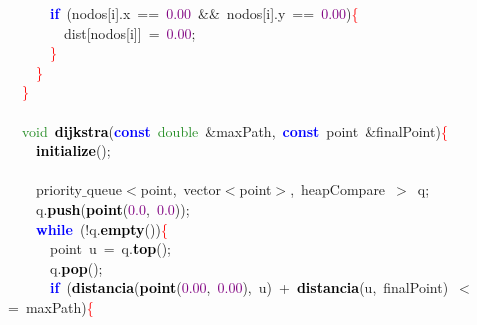 \mbox{}\ \ \ \ \ \ \textbf{\textcolor{Blue}{if}}\ \textcolor{BrickRed}{(}nodos\textcolor{BrickRed}{[}i\textcolor{BrickRed}{].}x\ \textcolor{BrickRed}{==}\ \textcolor{Purple}{0.00}\ \textcolor{BrickRed}{\&\&}\ nodos\textcolor{BrickRed}{[}i\textcolor{BrickRed}{].}y\ \textcolor{BrickRed}{==}\ \textcolor{Purple}{0.00}\textcolor{BrickRed}{)}\textcolor{Red}{\{} \\
\mbox{}\ \ \ \ \ \ \ \ dist\textcolor{BrickRed}{[}nodos\textcolor{BrickRed}{[}i\textcolor{BrickRed}{]]}\ \textcolor{BrickRed}{=}\ \textcolor{Purple}{0.00}\textcolor{BrickRed}{;} \\
\mbox{}\ \ \ \ \ \ \textcolor{Red}{\}} \\
\mbox{}\ \ \ \ \textcolor{Red}{\}} \\
\mbox{}\ \ \textcolor{Red}{\}} \\
\mbox{} \\
\mbox{}\ \ \textcolor{ForestGreen}{void}\ \textbf{\textcolor{Black}{dijkstra}}\textcolor{BrickRed}{(}\textbf{\textcolor{Blue}{const}}\ \textcolor{ForestGreen}{double}\ \textcolor{BrickRed}{\&}maxPath\textcolor{BrickRed}{,}\ \textbf{\textcolor{Blue}{const}}\ point\ \textcolor{BrickRed}{\&}finalPoint\textcolor{BrickRed}{)}\textcolor{Red}{\{} \\
\mbox{}\ \ \ \ \textbf{\textcolor{Black}{initialize}}\textcolor{BrickRed}{();} \\
\mbox{}\ \ \ \  \\
\mbox{}\ \ \ \ priority$\_$queue\textcolor{BrickRed}{$<$}point\textcolor{BrickRed}{,}\ vector\textcolor{BrickRed}{$<$}point\textcolor{BrickRed}{$>$,}\ heapCompare\ \textcolor{BrickRed}{$>$}\ q\textcolor{BrickRed}{;} \\
\mbox{}\ \ \ \ q\textcolor{BrickRed}{.}\textbf{\textcolor{Black}{push}}\textcolor{BrickRed}{(}\textbf{\textcolor{Black}{point}}\textcolor{BrickRed}{(}\textcolor{Purple}{0.0}\textcolor{BrickRed}{,}\ \textcolor{Purple}{0.0}\textcolor{BrickRed}{));} \\
\mbox{}\ \ \ \ \textbf{\textcolor{Blue}{while}}\ \textcolor{BrickRed}{(!}q\textcolor{BrickRed}{.}\textbf{\textcolor{Black}{empty}}\textcolor{BrickRed}{())}\textcolor{Red}{\{} \\
\mbox{}\ \ \ \ \ \ point\ u\ \textcolor{BrickRed}{=}\ q\textcolor{BrickRed}{.}\textbf{\textcolor{Black}{top}}\textcolor{BrickRed}{();} \\
\mbox{}\ \ \ \ \ \ q\textcolor{BrickRed}{.}\textbf{\textcolor{Black}{pop}}\textcolor{BrickRed}{();} \\
\mbox{}\ \ \ \ \ \ \textbf{\textcolor{Blue}{if}}\ \textcolor{BrickRed}{(}\textbf{\textcolor{Black}{distancia}}\textcolor{BrickRed}{(}\textbf{\textcolor{Black}{point}}\textcolor{BrickRed}{(}\textcolor{Purple}{0.00}\textcolor{BrickRed}{,}\ \textcolor{Purple}{0.00}\textcolor{BrickRed}{),}\ u\textcolor{BrickRed}{)}\ \textcolor{BrickRed}{+}\ \textbf{\textcolor{Black}{distancia}}\textcolor{BrickRed}{(}u\textcolor{BrickRed}{,}\ finalPoint\textcolor{BrickRed}{)}\ \textcolor{BrickRed}{$<$=}\ maxPath\textcolor{BrickRed}{)}\textcolor{Red}{\{} \\
